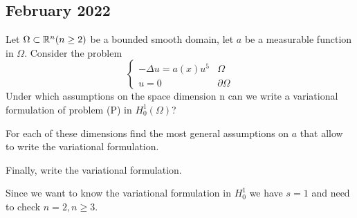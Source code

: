 \newpage
\subsection{February 2022}
\begin{exercise}
    Let \(\Omega \subset \mathbb{R}^n (n \geq 2)\) be a bounded smooth domain, let \(a\) be a measurable function in \(\Omega\).
    Consider the problem
    \[
        \begin{cases}
            - \Delta u = a(x) u^5 & \Omega \\
            u = 0 & \partial\Omega
        \end{cases}
        \tag*{(P)}
    \]
    Under which assumptions on the space dimension n can we write a variational formulation of problem (P) in
    \(H^1_0(\Omega)\)? 
    
    For each of these dimensions find the most general assumptions on \(a\) that allow to write the variational formulation. 
    
    Finally, write the variational formulation.
    \end{exercise}

    Since we want to know the variational formulation in \(H^1_0\) we have \(s = 1\) and need to check \(n = 2, n \geq 3\). 
    
